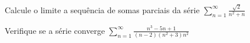 \documentclass[a4paper,12pt,fleqn]{article}
\begin{document}
Calcule o limite a sequência de somas parciais da série \;
\(
  \sum_{n=1}^{\infty} \frac{\sqrt{2}}{n^2 + n}
\)

%

Verifique se a série converge \;
\(
  \sum_{n=1}^\infty \frac{n^3 - 5n + 1}{(n-2)(n^2+3)n^2}
\)

%
%
\end{document}
